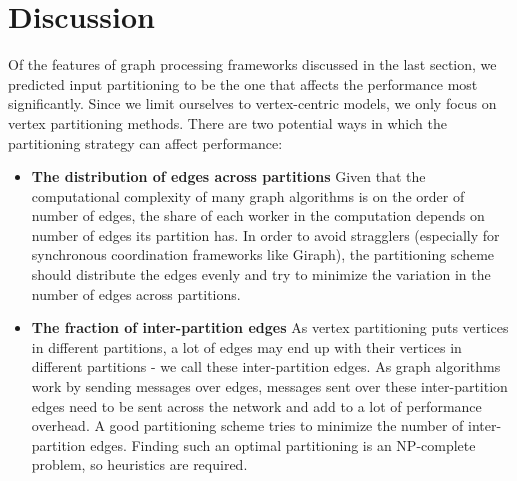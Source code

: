 \section{Discussion}
\label{sec:discussion}

Of the features of graph processing frameworks discussed in the last section, 
we predicted input partitioning to be the one that affects the performance most 
significantly. Since we limit ourselves to vertex-centric models, 
we only focus on vertex partitioning methods. There are two potential ways in 
which the partitioning strategy can affect performance:
\begin{itemize}
    \item \textbf{The distribution of edges across partitions} Given that the computational complexity 
    of many graph algorithms is on the order of number of edges, the share of 
    each worker in the 
    computation depends on number of edges its partition has. In order to avoid stragglers 
    (especially for synchronous coordination frameworks like Giraph), the partitioning scheme
    should distribute the edges evenly and try to minimize the variation in the number of edges 
    across partitions.
    \item \textbf{The fraction of inter-partition edges} As vertex partitioning puts vertices
    in different partitions, a lot of edges may end up with their vertices in different 
    partitions - we call these inter-partition edges. As graph algorithms work by sending 
    messages over edges, messages sent over these inter-partition edges need to 
    be sent across the network
    and add to a lot of performance overhead. A good partitioning scheme tries to minimize the 
    number of inter-partition edges. Finding such an optimal partitioning is an NP-complete problem, 
    so heuristics are required.
\end{itemize}

